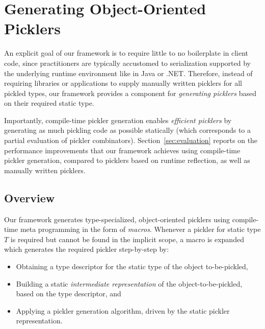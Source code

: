 \documentclass[10pt]{sigplanconf}
\theoremstyle{definition}
\theoremstyle{definition}
\begin{document}
\section{Generating Object-Oriented Picklers}
\label{sec:generation}

An explicit goal of our framework is to require little to no boilerplate in
client code, since practitioners are typically accustomed to serialization supported
by the underlying runtime environment like in Java or .NET. Therefore, instead
of requiring libraries or applications to supply manually written picklers for
all pickled types, our framework provides a component for {\em generating picklers}
based on their required static type.

Importantly, compile-time pickler generation enables {\em efficient picklers}
by generating as much pickling code as possible statically (which corresponds
to a partial evaluation of pickler combinators). Section~\ref{sec:evaluation}
reports on the performance improvements that our framework achieves using
compile-time pickler generation, compared to picklers based on runtime
reflection, as well as manually written picklers.


\subsection{Overview}

Our framework generates type-specialized, object-oriented picklers using
compile-time meta programming in the form of {\em macros}. Whenever
a pickler for static type $T$ is required but cannot be found in the implicit
scope, a macro is expanded which generates the required pickler step-by-step
by:

\begin{itemize}
\item Obtaining a type descriptor for the static type of the object to-be-pickled,

\item Building a static {\em intermediate representation} of the object-to-be-pickled,
based on the type descriptor, and

\item Applying a pickler generation algorithm, driven by the static pickler
representation.
\end{itemize}
\end{document}
